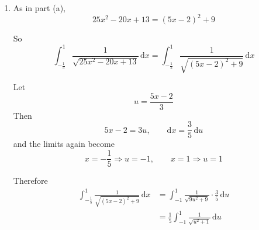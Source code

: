 \documentclass[leqno]{article}
\begin{document}
\begin{enumerate}[
  label=\textbf{\arabic*.},
  leftmargin=*,
  topsep=0pt,
  partopsep=0pt,
  parsep=0pt
]
\begin{tcolorbox}[colback=white, colframe=scarlet, title={\textbf{Solution}}, breakable, grow to left by=6mm, grow to right by=10mm]
\begin{enumerate}[label=\textbf{(\alph*)}]
  So
  \[
  \int_{-\frac15}^{1}\frac{1}{25x^2-20x+13}\,\mathrm{d}x
  = \int_{-\frac15}^{1}\frac{1}{(5x-2)^2+9}\,\mathrm{d}x
  \]

  Let
  \[
  u=\frac{5x-2}{3}
  \]
  Then
  \[
  5x-2=3u,
  \qquad \mathrm{d}x=\frac35\,\mathrm{d}u
  \]

  Change the limits:
  \[
  x=-\frac15 \;\Rightarrow\; u=\frac{-1-2}{3}=-1,
  \qquad
  x=1 \;\Rightarrow\; u=\frac{5-2}{3}=1
  \]

  Hence
  \begin{align*}
  \int_{-\frac15}^{1}\frac{1}{(5x-2)^2+9}\,\mathrm{d}x
  &= \int_{-1}^{1}\frac{1}{9u^2+9}\cdot \frac35\,\mathrm{d}u \\
  &= \frac{1}{15}\int_{-1}^{1}\frac{1}{1+u^2}\,\mathrm{d}u
  \end{align*}

  Using the standard result
  \[
  \int \frac{1}{1+u^2}\,\mathrm{d}u=\arctan u + c
  \]

  we get
  \begin{align*}
  \frac{1}{15}\int_{-1}^{1}\frac{1}{1+u^2}\,\mathrm{d}u
  &= \frac{1}{15}\left[\arctan u\right]_{-1}^{1} \\
  &= \frac{1}{15}\left(\arctan 1-\arctan(-1)\right) \\
  &= \frac{1}{15}\left(\frac{\pi}{4}-\left(-\frac{\pi}{4}\right)\right) \\
  &= \frac{1}{15}\cdot \frac{\pi}{2} \\
  &= \frac{\pi}{30}
  \end{align*}

  Therefore, the value of the integral is
  \[
  \frac{\pi}{30}
  \]

  \item As in part (a),
  \[
  25x^2-20x+13=(5x-2)^2+9
  \]

  So
  \[
  \int_{-\frac15}^{1}\frac{1}{\sqrt{25x^2-20x+13}}\,\mathrm{d}x
  = \int_{-\frac15}^{1}\frac{1}{\sqrt{(5x-2)^2+9}}\,\mathrm{d}x
  \]

  Let
  \[
  u=\frac{5x-2}{3}
  \]
  Then
  \[
  5x-2=3u,
  \qquad \mathrm{d}x=\frac35\,\mathrm{d}u
  \]
  and the limits again become
  \[
  x=-\frac15 \Rightarrow u=-1,
  \qquad
  x=1 \Rightarrow u=1
  \]

  Therefore
  \begin{align*}
  \int_{-\frac15}^{1}\frac{1}{\sqrt{(5x-2)^2+9}}\,\mathrm{d}x
  &= \int_{-1}^{1}\frac{1}{\sqrt{9u^2+9}}\cdot \frac35\,\mathrm{d}u \\
  &= \frac15\int_{-1}^{1}\frac{1}{\sqrt{u^2+1}}\,\mathrm{d}u
  \end{align*}


\end{enumerate}
\end{tcolorbox}
\end{enumerate}
\end{document}
